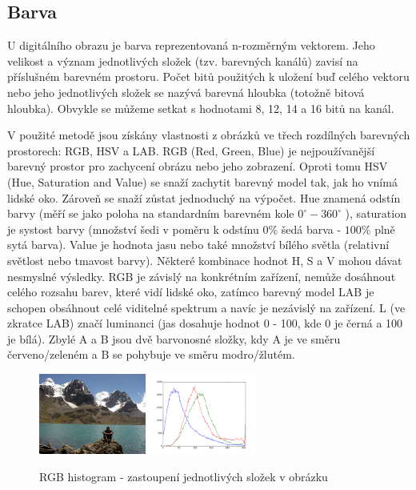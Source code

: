 \documentclass[czech,BP]{thesiskiv}
\begin{document}
\subsection{Barva}
\par U digitálního obrazu je barva reprezentovaná n-rozměrným vektorem. Jeho velikost a význam jednotlivých složek (tzv. barevných kanálů) zavisí na příslušném barevném prostoru. Počet bitů použitých k uložení buď celého vektoru nebo jeho jednotlivých složek se nazývá barevná hloubka (totožně bitová hloubka). Obvykle se můžeme setkat s hodnotami 8, 12, 14 a 16 bitů na kanál. 
\\
\par V použité metodě jsou získány vlastnosti z obrázků ve třech rozdílných barevných prostorech: RGB, HSV a LAB. RGB (Red, Green, Blue) je nejpoužívanější barevný prostor pro zachycení obrázu nebo jeho zobrazení. Oproti tomu HSV (Hue, Saturation and Value) se snaží zachytit barevný model tak, jak ho vnímá lidské oko. Zároveň se snaží zůstat jednoduchý na výpočet. Hue znamená odstín barvy (měří se jako poloha na standardním barevném kole $0^{\circ} - 360^{\circ}$ ), saturation je systost barvy (množství šedi v poměru k odstínu $0 \%$ šedá barva - $100 \%$ plně sytá barva). Value je hodnota jasu nebo také množství bílého světla (relativní světlost nebo tmavost barvy). Některé kombinace hodnot H, S a V mohou dávat nesmyslné výsledky. RGB je závislý na konkrétním zařízení, nemůže dosáhnout celého rozsahu barev, které vidí lidské oko, zatímco barevný model LAB je schopen obsáhnout celé viditelné spektrum a navíc je nezávislý na zařízení. L (ve zkratce LAB) značí luminanci (jas dosahuje hodnot 0 - 100, kde 0 je černá a 100 je bílá). Zbylé A a B jsou dvě barvonosné složky, kdy A je ve směru červeno/zeleném a B se pohybuje ve směru modro/žlutém.

\begin{figure}[H]
		\centering
		\includegraphics[height=100px]{./img/img_histogram.jpg}	
		\includegraphics[height=100px]{./img/bgr_histogram.png}	
		\caption{RGB histogram - zastoupení jednotlivých složek v obrázku}
\end{figure}
\end{document}
